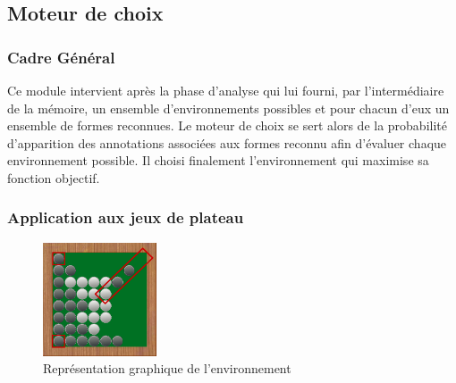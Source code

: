 \subsection{Moteur de choix}

\subsubsection{Cadre Général}


Ce module intervient après la phase d'analyse qui lui fourni, par l'intermédiaire de la mémoire, un ensemble d'environnements possibles et pour chacun d'eux un ensemble de formes reconnues. Le \og moteur de choix \fg{} se sert alors de la probabilité d'apparition des annotations associées aux formes reconnu afin d'évaluer chaque environnement possible. Il choisi finalement l'environnement qui maximise sa fonction objectif.

\subsubsection{Application aux jeux de plateau}


\begin{figure}[H] 
  \begin{center}
		\includegraphics[width=0.3\textwidth]{files/raisonneur/moteur_de_choix} 
	\end{center}
\caption{Représentation graphique de l'environnement} 
\label{img_env}
\end{figure}
